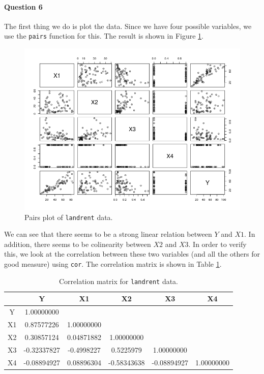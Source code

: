\documentclass[]{article}
\let\oldparagraph\paragraph
\renewcommand{\paragraph}[1]{\oldparagraph{#1}\mbox{}}
\begin{document}
\paragraph{\Large Question 6}\normalsize

The first thing we do is plot the data. Since we have four possible variables, we use the \texttt{pairs} function for this. The result is shown in Figure \ref{fig6}. 

\begin{figure}[!ht]
\centering
\includegraphics[width=\textwidth]{pairs.png}
\caption{Pairs plot of \texttt{landrent} data.}
\label{fig6}
\end{figure}

We can see that there seems to be a strong linear relation between $Y$ and $X1$. In addition, there seems to be colinearity between $X2$ and $X3$. In order to verify this, we look at the correlation between these two variables (and all the others for good measure) using \texttt{cor}. The correlation matrix is shown in Table \ref{q6}.

\begin{table}[!ht]
\centering
\caption{Correlation matrix for \texttt{landrent} data.}
\begin{tabular}{c|c|c|c|c|c}
    &       Y      &       X1     &       X2      &       X3      &     X4     \\
\hline
 Y  &  1.00000000  &              &               &               &            \\
 X1 &  0.87577226  &  1.00000000  &               &               &            \\
 X2 &  0.30857124  &  0.04871882  &   1.00000000  &               &            \\
 X3 & -0.32337827  & -0.4998227   &   0.5225979   &   1.00000000  &            \\
 X4 & -0.08894927  &  0.08896304  &  -0.58343638  &  -0.08894927  & 1.00000000 \\
\end{tabular}
\label{q6}
\end{table}
\end{document}
